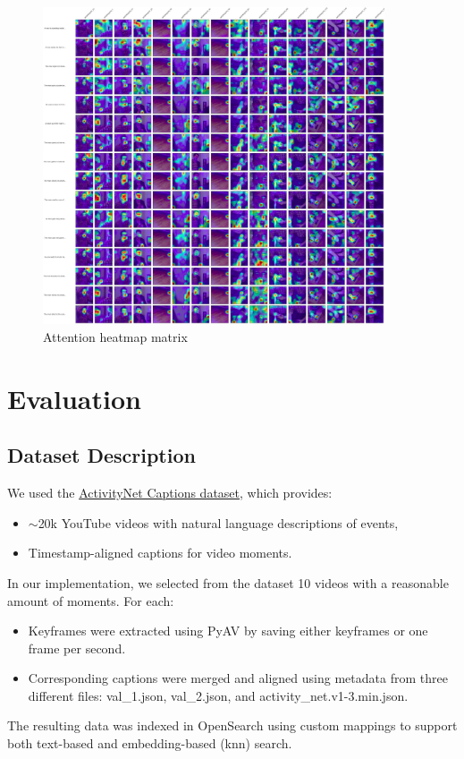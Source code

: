 \documentclass[runningheads]{llncs}
\begin{document}
\begin{figure}[!htb]
  \centering
  \includegraphics[width=0.9\textwidth, clip=true]{../figures/attention_heatmap_matrix.png}
  \caption{Attention heatmap matrix}\label{atent_hm_matrix}
\end{figure}

\section{Evaluation}

\subsection{Dataset Description}
We used the \href{https://huggingface.co/datasets/HuggingFaceM4/ActivitiyNet_Captions}{ActivityNet Captions dataset}, which provides:

\begin{itemize}
    \item \ensuremath{\sim}20k YouTube videos with natural language descriptions of events,
    \item Timestamp-aligned captions for video moments.
\end{itemize}

In our implementation, we selected from the dataset 10 videos with a reasonable amount of moments. For each:

\begin{itemize}
    \item Keyframes were extracted using PyAV by saving either keyframes or one frame per second.
    \item Corresponding captions were merged and aligned using metadata from three different files: val\_1.json, val\_2.json, and activity\_net.v1-3.min.json.
\end{itemize}

The resulting data was indexed in OpenSearch using custom mappings to support both text-based and embedding-based (knn) search.
\end{document}

